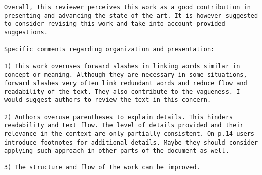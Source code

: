 \documentclass[preprint]{elsarticle}
\begin{document}
\begin{verbatim}
Overall, this reviewer perceives this work as a good contribution in presenting and advancing the state-of-the art. It is however suggested to consider revising this work and take into account provided suggestions.

Specific comments regarding organization and presentation:

1) This work overuses forward slashes in linking words similar in concept or meaning. Although they are necessary in some situations, forward slashes very often link redundant words and reduce flow and readability of the text. They also contribute to the vagueness. I would suggest authors to review the text in this concern.

2) Authors overuse parentheses to explain details. This hinders readability and text flow. The level of details provided and their relevance in the context are only partially consistent. On p.14 users introduce footnotes for additional details. Maybe they should consider applying such approach in other parts of the document as well.

3) The structure and flow of the work can be improved.
\end{verbatim}
\end{document}
